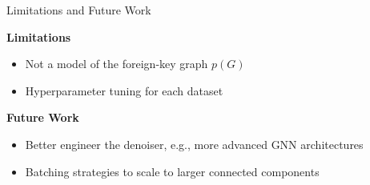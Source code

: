 \begin{frame}[fragile]{Limitations and Future Work}

  \textbf{Limitations}
  \begin{itemize}
    \item Not a model of the foreign-key graph $p(G)$
    \item Hyperparameter tuning for each dataset
  \end{itemize}

  \textbf{Future Work}
  \begin{itemize}
    \item Better engineer the denoiser, e.g., more advanced GNN architectures
    \item Batching strategies to scale to larger connected components
  \end{itemize}

\end{frame}
